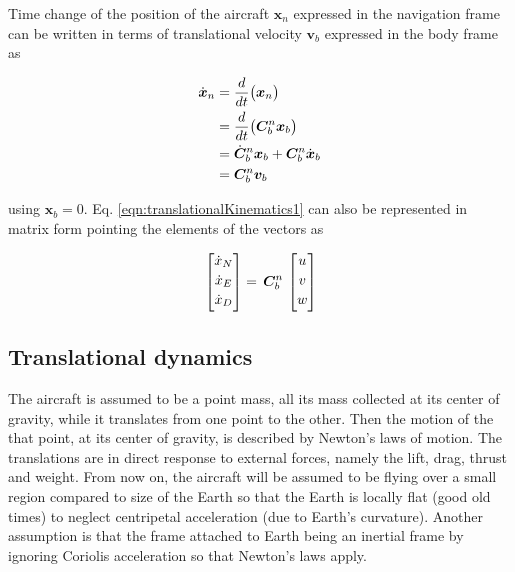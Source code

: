 Time change of the position of the aircraft $\bm{x}_n$ expressed in the navigation frame can be written in terms of translational velocity $\bm{v}_b$ expressed in the body frame as

\begin{align}{\label{eqn:translationalKinematics1}}
\begin{split}
\dot{\bm{x}}_n & = \frac{d}{dt} \big( \bm{x}_n \big) \\
                        & = \frac{d}{dt} \big(\bm{C}_b^n \bm{x}_b \big) \\
                        & = \dot{\bm{C}}_b^n \bm{x}_b + \bm{C}_b^n  \dot{\bm{x}}_b \\
                        & = \bm{C}_b^n \bm{v}_b
\end{split}
\end{align}

using $\bm{x}_b=0$. Eq. \ref{eqn:translationalKinematics1} can also be represented in matrix form pointing the elements of the vectors as

\begin{equation}{\label{eqn:angularMomentumInPrincipleAxes}}
\begin{bmatrix}
\dot{x}_N\\[0.2em]
\dot{x}_E\\[0.2em]
\dot{x}_D\\[0.2em]
\end{bmatrix}
 =\,
\bm{C}_b^n
\,
\begin{bmatrix}
u\\[0.2em]
v\\[0.2em]
w\\[0.2em]
\end{bmatrix}
\end{equation}

\subsection{Translational dynamics}

The aircraft is assumed to be a point mass, all its mass collected at its center of gravity, while it translates from one point to the other.
Then the motion of the that point, at its center of gravity, is described by Newton's laws of motion.
The translations are in direct response to external forces, namely the lift, drag, thrust and weight.
From now on, the aircraft will be assumed to be flying over a small region compared to size of the Earth so that the Earth is locally flat (good old times) to neglect centripetal acceleration (due to Earth's curvature). 
Another assumption is that the frame attached to Earth being an inertial frame by ignoring Coriolis acceleration so that Newton's laws apply. 

